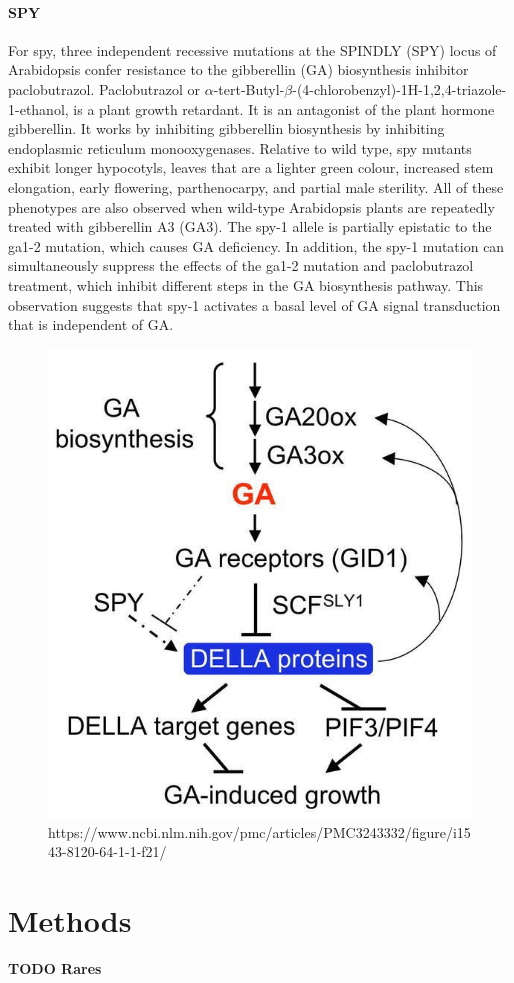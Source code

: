 \documentclass[10pt,a4paper]{article}
\begin{document}
\paragraph{SPY}
For spy, three independent recessive mutations at the SPINDLY (SPY) locus of Arabidopsis confer resistance to the gibberellin (GA) biosynthesis inhibitor paclobutrazol. Paclobutrazol or $ \alpha $-tert-Butyl-$ \beta $-(4-chlorobenzyl)-1H-1,2,4-triazole-1-ethanol, is a plant growth retardant. It is an antagonist of the plant hormone gibberellin. It works by inhibiting gibberellin biosynthesis by inhibiting endoplasmic reticulum monooxygenases. Relative to wild type, spy mutants exhibit longer hypocotyls, leaves that are a lighter green colour, increased stem elongation, early flowering, parthenocarpy, and partial male sterility. All of these phenotypes are also observed when wild-type Arabidopsis plants are repeatedly treated with gibberellin A3 (GA3). The spy-1 allele is partially epistatic to the ga1-2 mutation, which causes GA deficiency. In addition, the spy-1 mutation can simultaneously suppress the effects of the ga1-2 mutation and paclobutrazol treatment, which inhibit different steps in the GA biosynthesis pathway. This observation suggests that spy-1 activates a basal level of GA signal transduction that is independent of GA\cite{lee_gibberellin_2002}.



\begin{figure}[H]
	\centering
	\includegraphics[width=0.4\linewidth]{img/GASPYpathway}
	\caption[GAI and SPY pathways]{https://www.ncbi.nlm.nih.gov/pmc/articles/PMC3243332/figure/i1543-8120-64-1-1-f21/}
	\label{fig:gaspypathway}
\end{figure}


\section*{Methods} \textbf{TODO Rares}
\end{document}
